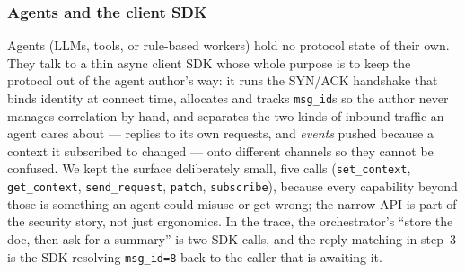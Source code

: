 \documentclass[11pt]{article}
\begin{document}
\subsubsection{Agents and the client SDK}\label{sec:arch:agents}
Agents (LLMs, tools, or rule-based workers) hold no protocol state of their own. They talk to a thin
async client SDK whose whole purpose is to keep the protocol out of the agent author's way: it runs the
SYN/ACK handshake that binds identity at connect time, allocates and tracks \texttt{msg\_id}s so the
author never manages correlation by hand, and separates the two kinds of inbound traffic an agent
cares about --- replies to its own requests, and \emph{events} pushed because a context it subscribed to
changed --- onto different channels so they cannot be confused. We kept the surface deliberately small,
five calls (\texttt{set\_context}, \texttt{get\_context}, \texttt{send\_request}, \texttt{patch},
\texttt{subscribe}), because every capability beyond those is something an agent could misuse or get
wrong; the narrow API is part of the security story, not just ergonomics. In the trace, the
orchestrator's ``store the doc, then ask for a summary'' is two SDK calls, and the reply-matching in
step~3 is the SDK resolving \texttt{msg\_id=8} back to the caller that is awaiting it.
\end{document}
